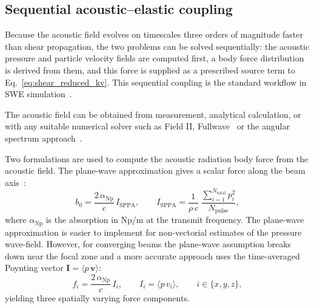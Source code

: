 \documentclass{iopjournal}
\begin{document}
\subsection{Sequential acoustic--elastic coupling}
\label{sec:coupling}

Because the acoustic field evolves on timescales three orders of magnitude
faster than shear propagation, the two problems can be solved sequentially:
the acoustic pressure and particle velocity fields are computed first, a body
force distribution is derived from them, and this force is supplied as a
prescribed source term to Eq.~\eqref{eq:shear_reduced_kv}. This sequential
coupling is the standard workflow in SWE
simulation~\cite{palmeri2017fem,yang2018gpu}.

The acoustic field can be obtained from measurement, analytical calculation, or with any suitable numerical solver such
as Field II, Fullwave~\cite{pinton2020fullwave} or the angular
spectrum approach~\cite{zeng2008evaluation}.

Two formulations are used to compute the acoustic radiation body force from the acoustic field.
The plane-wave approximation gives a scalar force along the beam
axis~\cite{nyborg1965acoustic,torr1984acoustic}:
\begin{equation}
  b_0 = \frac{2\,\alpha_{\mathrm{Np}}}{c}\,I_{\mathrm{SPPA}},
  \qquad
  I_{\mathrm{SPPA}} = \frac{1}{\rho\, c}
    \;\frac{\sum_{i=1}^{N_{\mathrm{total}}} p_i^2}{N_{\mathrm{pulse}}},
  \label{eq:isppa_norm}
\end{equation}
where $\alpha_{\mathrm{Np}}$ is the absorption in Np/m at the transmit
frequency. The plane-wave approximation is easier to implement for non-vectorial estimates of the pressure wave-field. However, for converging beams the plane-wave assumption breaks down near the
focal zone and a more accurate approach uses the time-averaged Poynting vector
$\bm{I} = \langle p\, \bm{v} \rangle$:
\begin{equation}
  f_i = \frac{2\,\alpha_{\mathrm{Np}}}{c}\,I_i,
  \qquad
  I_i = \langle p\, v_i \rangle,
  \qquad i \in \{x,y,z\},
  \label{eq:arf_poynting}
\end{equation}
yielding three spatially varying force components.

\end{document}

